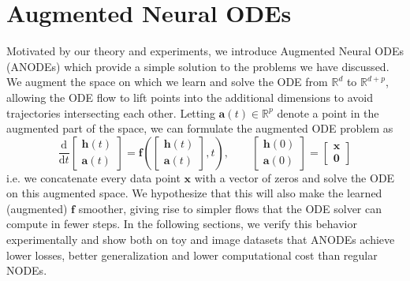 \documentclass{article}
\begin{document}
\section{Augmented Neural ODEs}
Motivated by our theory and experiments, we introduce Augmented Neural ODEs (ANODEs) which provide a simple solution to the problems we have discussed. We augment the space on which we learn and solve the ODE from $\mathbb{R}^d$ to $\mathbb{R}^{d+p}$, allowing the ODE flow to lift points into the additional dimensions to avoid trajectories intersecting each other. Letting $\mathbf{a}(t) \in \mathbb{R}^p$ denote a point in the augmented part of the space, we can formulate the augmented ODE problem as
\[ \frac{\mathrm{d}}{\mathrm{d}t} \begin{bmatrix} \mathbf{h}(t) \\ \mathbf{a}(t) \end{bmatrix} = \mathbf{f}(\begin{bmatrix} \mathbf{h}(t) \\ \mathbf{a}(t) \end{bmatrix}, t), \qquad \begin{bmatrix} \mathbf{h}(0) \\ \mathbf{a}(0) \end{bmatrix} = \begin{bmatrix} \mathbf{x} \\ \mathbf{0} \end{bmatrix} \]
i.e. we concatenate every data point $\mathbf{x}$ with a vector of zeros and solve the ODE on this augmented space. We hypothesize that this will also make the learned (augmented) $\mathbf{f}$ smoother, giving rise to simpler flows that the ODE solver can compute in fewer steps. In the following sections, we verify this behavior experimentally and show both on toy and image datasets that ANODEs achieve lower losses, better generalization and lower computational cost than regular NODEs.
\end{document}
